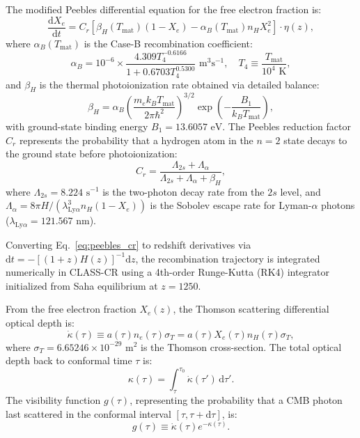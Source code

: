 \documentclass[aps,prd,reprint,superscriptaddress,nofootinbib,twocolumn]{revtex4-2}
\begin{document}
The modified Peebles differential equation for the free electron fraction is:
\begin{equation}
\label{eq:peebles_cr}
\frac{\mathrm{d}X_e}{\mathrm{d}t} = C_r \left[ \beta_H(T_{\text{mat}}) (1 - X_e) - \alpha_B(T_{\text{mat}}) n_H X_e^2 \right] \cdot \eta(z),
\end{equation}
where $\alpha_B(T_{\text{mat}})$ is the Case-B recombination coefficient:
\begin{equation}
\label{eq:case_b}
\alpha_B = 10^{-6} \times \frac{4.309 T_4^{-0.6166}}{1 + 0.6703 T_4^{0.5300}}\text{ m}^3\text{s}^{-1}, \quad T_4 \equiv \frac{T_{\text{mat}}}{10^4\text{ K}},
\end{equation}
and $\beta_H$ is the thermal photoionization rate obtained via detailed balance:
\begin{equation}
\label{eq:beta_h}
\beta_H = \alpha_B \left(\frac{m_e k_B T_{\text{mat}}}{2\pi \hbar^2}\right)^{3/2} \exp\left(-\frac{B_1}{k_B T_{\text{mat}}}\right),
\end{equation}
with ground-state binding energy $B_1 = 13.6057\text{ eV}$. The Peebles reduction factor $C_r$ represents the probability that a hydrogen atom in the $n = 2$ state decays to the ground state before photoionization:
\begin{equation}
\label{eq:peebles_cr_factor}
C_r = \frac{\Lambda_{2s} + \Lambda_\alpha}{\Lambda_{2s} + \Lambda_\alpha + \beta_H},
\end{equation}
where $\Lambda_{2s} = 8.224\text{ s}^{-1}$ is the two-photon decay rate from the $2s$ level, and $\Lambda_\alpha = 8\pi H / (\lambda_{\text{Ly}\alpha}^3 n_H (1 - X_e))$ is the Sobolev escape rate for Lyman-$\alpha$ photons ($\lambda_{\text{Ly}\alpha} = 121.567\text{ nm}$).

Converting Eq.~\eqref{eq:peebles_cr} to redshift derivatives via $\mathrm{d}t = -[(1+z)H(z)]^{-1}\mathrm{d}z$, the recombination trajectory is integrated numerically in CLASS-CR using a 4th-order Runge-Kutta (RK4) integrator initialized from Saha equilibrium at $z = 1250$.

From the free electron fraction $X_e(z)$, the Thomson scattering differential optical depth is:
\begin{equation}
\label{eq:kappa_dot}
\dot{\kappa}(\tau) \equiv a(\tau) n_e(\tau) \sigma_T = a(\tau) X_e(\tau) n_H(\tau) \sigma_T,
\end{equation}
where $\sigma_T = 6.65246 \times 10^{-29}\text{ m}^2$ is the Thomson cross-section. The total optical depth back to conformal time $\tau$ is:
\begin{equation}
\label{eq:optical_depth}
\kappa(\tau) = \int_\tau^{\tau_0} \dot{\kappa}(\tau')\,\mathrm{d}\tau'.
\end{equation}
The visibility function $g(\tau)$, representing the probability that a CMB photon last scattered in the conformal interval $[\tau, \tau + \mathrm{d}\tau]$, is:
\begin{equation}
\label{eq:visibility}
g(\tau) \equiv \dot{\kappa}(\tau) e^{-\kappa(\tau)}.
\end{equation}
\end{document}
